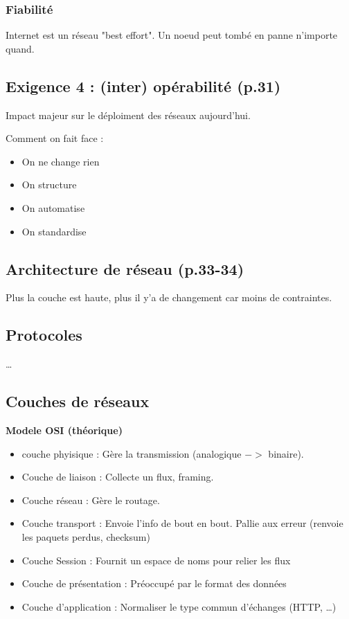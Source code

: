 \documentclass[a4paper, 12pt]{article}
\begin{document}
\subsubsection*{Fiabilité}

Internet est un réseau "best effort". Un noeud peut tombé en panne n'importe quand.

\subsection*{Exigence 4 : (inter) opérabilité (p.31)}
Impact majeur sur le déploiment des réseaux aujourd'hui.

Comment on fait face : 
\begin{itemize}
    \item On ne change rien
    \item On structure
    \item On automatise
    \item On standardise
\end{itemize}

\subsection*{Architecture de réseau (p.33-34)}

Plus la couche est haute, plus il y'a de changement car moins de contraintes.

\subsection*{Protocoles}
\dots

\subsection*{Couches de réseaux}

\textbf{Modele OSI (théorique)}
\begin{itemize}
    \item couche phyisique : Gère la transmission (analogique $->$ binaire).
    \item Couche de liaison : Collecte un flux, framing.
    \item Couche réseau : Gère le routage.
    \item Couche transport : Envoie l'info de bout en bout. Pallie aux erreur (renvoie les paquets perdus, checksum)
    \item Couche Session : Fournit un espace de noms pour relier les flux
    \item Couche de présentation : Préoccupé par le format des données
    \item Couche d'application : Normaliser le type commun d'échanges (HTTP, \dots)
\end{itemize}
\end{document}
